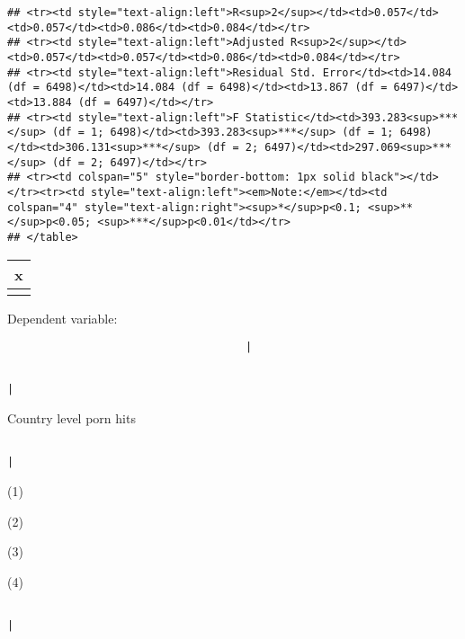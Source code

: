 \documentclass[]{article}
\begin{document}
\begin{verbatim}
## <tr><td style="text-align:left">R<sup>2</sup></td><td>0.057</td><td>0.057</td><td>0.086</td><td>0.084</td></tr>
## <tr><td style="text-align:left">Adjusted R<sup>2</sup></td><td>0.057</td><td>0.057</td><td>0.086</td><td>0.084</td></tr>
## <tr><td style="text-align:left">Residual Std. Error</td><td>14.084 (df = 6498)</td><td>14.084 (df = 6498)</td><td>13.867 (df = 6497)</td><td>13.884 (df = 6497)</td></tr>
## <tr><td style="text-align:left">F Statistic</td><td>393.283<sup>***</sup> (df = 1; 6498)</td><td>393.283<sup>***</sup> (df = 1; 6498)</td><td>306.131<sup>***</sup> (df = 2; 6497)</td><td>297.069<sup>***</sup> (df = 2; 6497)</td></tr>
## <tr><td colspan="5" style="border-bottom: 1px solid black"></td></tr><tr><td style="text-align:left"><em>Note:</em></td><td colspan="4" style="text-align:right"><sup>*</sup>p<0.1; <sup>**</sup>p<0.05; <sup>***</sup>p<0.01</td></tr>
## </table>
\end{verbatim}

\begin{longtable}[]{@{}l@{}}
\toprule
x\tabularnewline
\midrule
\endhead
\tabularnewline
\bottomrule
\end{longtable}

\textbar{}

Dependent variable:

\begin{verbatim}
                                     |
\end{verbatim}

\textbar{}

\begin{verbatim}
                                                                                                                                                        |
\end{verbatim}

\textbar{}

Country level porn hits

\begin{verbatim}
                                                                                                                                                |
\end{verbatim}

\textbar{}

(1)

(2)

(3)

(4)

\begin{verbatim}
                                                                                                                                            |
\end{verbatim}
\end{document}
